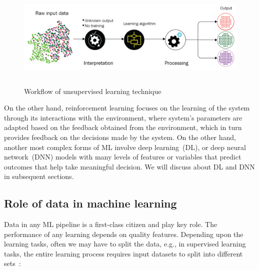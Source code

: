 \begin{figure}[h]
	\centering
	\includegraphics[width=0.9\linewidth,height=50mm]{images/unsup.png}
	\caption{Workflow of unsupervised learning technique~\cite{karimScalaML2019}} 
	\label{fig:ml_pipeline_unsup}
\end{figure}

\hspace*{3.5mm} On the other hand, reinforcement learning focuses on the learning of the system through its interactions with the environment, where system's parameters are adapted based on the feedback obtained from the environment, which in turn provides feedback on the decisions made by the system. On the other hand, another most complex forms of ML involve deep learning~(DL), or deep neural network~(DNN) models with many levels of features or variables that predict outcomes that help take meaningful decision. We will discuss about DL and DNN in subsequent sections. 



\subsection{Role of data in machine learning}
Data in any ML pipeline is a first-class citizen and play key role. The performance of any learning depends on quality features. Depending upon the learning tasks, often we may have to split the data, e.g., in supervised learning tasks, the entire learning process requires input datasets to split into different sets~\cite{karim2018java}:

